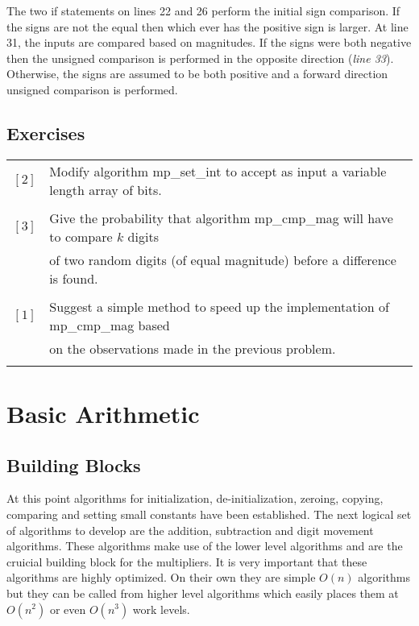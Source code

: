 \documentclass[b5paper]{book}
\begin{document}
The two if statements on lines 22 and 26 perform the initial sign comparison.  If the signs are not the equal then which ever
has the positive sign is larger.   At line 31, the inputs are compared based on magnitudes.  If the signs were both negative then 
the unsigned comparison is performed in the opposite direction (\textit{line 33}).  Otherwise, the signs are assumed to 
be both positive and a forward direction unsigned comparison is performed.

\section*{Exercises}
\begin{tabular}{cl}
$\left [ 2 \right ]$ & Modify algorithm mp\_set\_int to accept as input a variable length array of bits. \\
                     & \\
$\left [ 3 \right ]$ & Give the probability that algorithm mp\_cmp\_mag will have to compare $k$ digits  \\
                     & of two random digits (of equal magnitude) before a difference is found. \\
                     & \\
$\left [ 1 \right ]$ & Suggest a simple method to speed up the implementation of mp\_cmp\_mag based  \\
                     & on the observations made in the previous problem. \\
                     &
\end{tabular}

\chapter{Basic Arithmetic}
\section{Building Blocks}
At this point algorithms for initialization, de-initialization, zeroing, copying, comparing and setting small constants have been 
established.  The next logical set of algorithms to develop are the addition, subtraction and digit movement algorithms.  These 
algorithms make use of the lower level algorithms and are the cruicial building block for the multipliers.  It is very important that these 
algorithms are highly optimized.  On their own they are simple $O(n)$ algorithms but they can be called from higher level algorithms 
which easily places them at $O(n^2)$ or even $O(n^3)$ work levels.  
\end{document}
